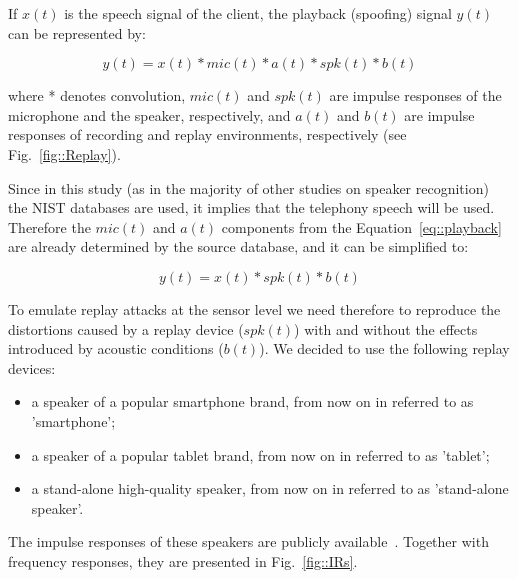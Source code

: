 If $x(t)$ is the speech signal of the client, the playback (spoofing) signal $y(t)$ can be represented by:

\begin{equation}
y(t) = x(t)* mic(t) * a(t) * spk(t) * b(t)
\label{eq::playback}
\end{equation}

where * denotes convolution, $mic(t)$ and $spk(t)$ are impulse responses of the microphone and the speaker, respectively, and $a(t)$ and $b(t)$ are impulse responses of recording and replay environments, respectively (see Fig.~\ref{fig::Replay}). 

Since in this study (as in the majority of other studies on speaker recognition) the NIST databases are used, it implies that the telephony speech will be used. Therefore the $mic(t)$ and $a(t)$ components from the Equation~\ref{eq::playback} are already determined by the source database, and it can be simplified to:

\begin{equation}
y(t) = x(t)* spk(t) * b(t)
\label{eq:playback_simple}
\end{equation}

To emulate replay attacks at the sensor level we need therefore to reproduce the distortions caused by a replay device ($spk(t)$) with and without the effects introduced by acoustic conditions ($b(t)$). We decided to use the following replay devices:

\begin{itemize}
\item a speaker of a popular smartphone brand, from now on in referred to as 'smartphone';
\item a speaker of a popular tablet brand, from now on in referred to as 'tablet';
\item a stand-alone high-quality speaker, from now on in referred to as 'stand-alone speaker'.
\end{itemize}

The impulse responses of these speakers are publicly available~\cite{Brown2014}. Together with frequency responses, they are presented in Fig.~\ref{fig::IRs}.



